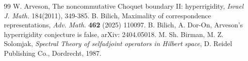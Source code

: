 \documentclass[reqno]{amsproc}
\numberwithin{equation}{section}
\theoremstyle{remark}
\theoremstyle{definition}
\begin{document}
   \begin{thebibliography}{99}
W. Arveson, The noncommutative Choquet
boundary II: hyperrigidity, {\em Israel J.
Math.} 184(2011), 349-385.
    B. Bilich, Maximality of correspondence
representations, {\em Adv. Math.} {\bf 462} (2025)
110097.
    B. Bilich,  A. Dor-On,
Arveson's hyperrigidity conjecture is false, arXiv:
2404.05018.
M. Sh. Birman, M. Z. Solomjak, {\em Spectral
Theory of selfadjoint operators in Hilbert
space}, D. Reidel Publishing Co., Dordrecht,
1987.

\end{thebibliography}
\end{document}
